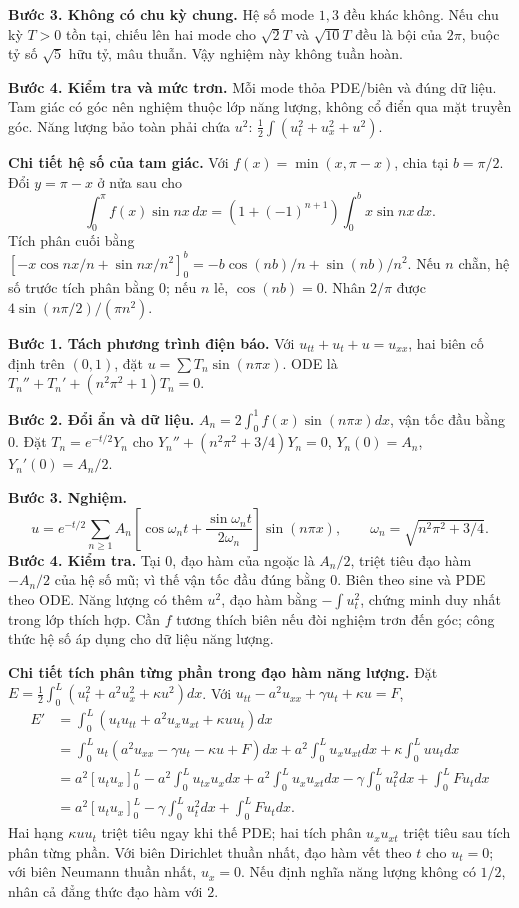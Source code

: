 \textbf{Bước 3. Không có chu kỳ chung.} Hệ số mode $1,3$ đều khác không. Nếu chu kỳ $T>0$ tồn tại, chiếu lên hai mode cho $\sqrt2T$ và $\sqrt{10}T$ đều là bội của $2\pi$, buộc tỷ số $\sqrt5$ hữu tỷ, mâu thuẫn. Vậy nghiệm này không tuần hoàn.

\textbf{Bước 4. Kiểm tra và mức trơn.} Mỗi mode thỏa PDE/biên và đúng dữ liệu. Tam giác có góc nên nghiệm thuộc lớp năng lượng, không cổ điển qua mặt truyền góc. Năng lượng bảo toàn phải chứa $u^2$: $\frac12\int(u_t^2+u_x^2+u^2)$.

\textbf{Chi tiết hệ số của tam giác.} Với $f(x)=\min(x,\pi-x)$, chia tại $b=\pi/2$. Đổi $y=\pi-x$ ở nửa sau cho
\[\int_0^\pi f(x)\sin nx\,dx=(1+(-1)^{n+1})\int_0^b x\sin nx\,dx.\]
Tích phân cuối bằng $[-x\cos nx/n+\sin nx/n^2]_0^b=-b\cos(nb)/n+\sin(nb)/n^2$. Nếu $n$ chẵn, hệ số trước tích phân bằng $0$; nếu $n$ lẻ, $\cos(nb)=0$. Nhân $2/\pi$ được $4\sin(n\pi/2)/(\pi n^2)$.

\textbf{Bước 1. Tách phương trình điện báo.} Với $u_{tt}+u_t+u=u_{xx}$, hai biên cố định trên $(0,1)$, đặt $u=\sum T_n\sin(n\pi x)$. ODE là $T_n''+T_n'+(n^2\pi^2+1)T_n=0$.

\textbf{Bước 2. Đổi ẩn và dữ liệu.} $A_n=2\int_0^1f(x)\sin(n\pi x)dx$, vận tốc đầu bằng $0$. Đặt $T_n=e^{-t/2}Y_n$ cho $Y_n''+(n^2\pi^2+3/4)Y_n=0$, $Y_n(0)=A_n$, $Y_n'(0)=A_n/2$.

\textbf{Bước 3. Nghiệm.}
\[u=e^{-t/2}\sum_{n\ge1}A_n\left[\cos\omega_nt+\frac{\sin\omega_nt}{2\omega_n}\right]\sin(n\pi x),\qquad\omega_n=\sqrt{n^2\pi^2+3/4}.\]
\textbf{Bước 4. Kiểm tra.} Tại $0$, đạo hàm của ngoặc là $A_n/2$, triệt tiêu đạo hàm $-A_n/2$ của hệ số mũ; vì thế vận tốc đầu đúng bằng $0$. Biên theo sine và PDE theo ODE. Năng lượng có thêm $u^2$, đạo hàm bằng $-\int u_t^2$, chứng minh duy nhất trong lớp thích hợp. Cần $f$ tương thích biên nếu đòi nghiệm trơn đến góc; công thức hệ số áp dụng cho dữ liệu năng lượng.

\textbf{Chi tiết tích phân từng phần trong đạo hàm năng lượng.} Đặt $E=\frac12\int_0^L(u_t^2+a^2u_x^2+\kappa u^2)dx$. Với $u_{tt}-a^2u_{xx}+\gamma u_t+\kappa u=F$,
\[\begin{aligned}
E'&=\int_0^L(u_tu_{tt}+a^2u_xu_{xt}+\kappa uu_t)dx\\
&=\int_0^Lu_t(a^2u_{xx}-\gamma u_t-\kappa u+F)dx
+a^2\int_0^Lu_xu_{xt}dx+\kappa\int_0^Luu_tdx\\
&=a^2[u_tu_x]_0^L-a^2\int_0^Lu_{tx}u_xdx
+a^2\int_0^Lu_xu_{xt}dx-\gamma\int_0^Lu_t^2dx+\int_0^LFu_tdx\\
&=a^2[u_tu_x]_0^L-\gamma\int_0^Lu_t^2dx+\int_0^LFu_tdx.
\end{aligned}\]
Hai hạng $\kappa uu_t$ triệt tiêu ngay khi thế PDE; hai tích phân $u_xu_{xt}$ triệt tiêu sau tích phân từng phần. Với biên Dirichlet thuần nhất, đạo hàm vết theo $t$ cho $u_t=0$; với biên Neumann thuần nhất, $u_x=0$. Nếu định nghĩa năng lượng không có $1/2$, nhân cả đẳng thức đạo hàm với $2$.

